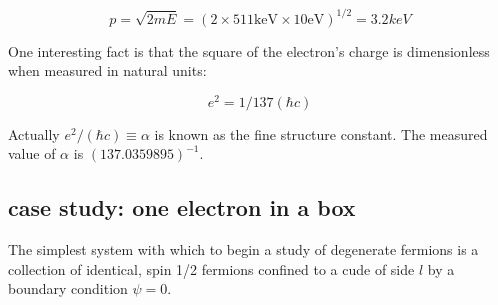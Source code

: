 \documentclass[a4paper, 11pt]{article}
\numberwithin{equation}{subsection}
\begin{document}
    \begin{equation}
      p = \sqrt{2 m E} = (2 \times 511 \textrm{keV} \times 10 \textrm{eV}) ^{1/2} = 3.2 keV
    \end{equation}

    One interesting fact is that the square of the electron's charge is dimensionless when measured in natural units:

    \begin{equation}
      e ^2 = 1/137 (\hbar c)
    \end{equation}

    Actually $e^2 / (\hbar c) \equiv \alpha$ is known as the fine structure constant. The measured value of $\alpha$ is $(137.0359895)^{-1}$.

  \subsection{case study: one electron in a box}

    The simplest system with which to begin a study of degenerate fermions is a collection of identical, spin 1/2 fermions confined to a cude of side $l$ by a boundary condition $\psi = 0$. 





\newpage

\end{document}
